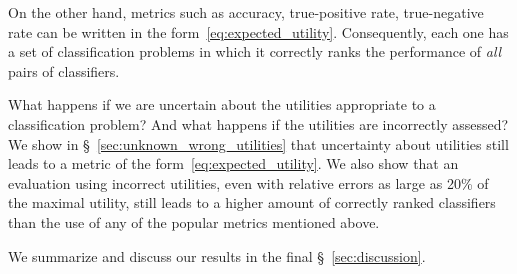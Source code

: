 \documentclass[\ifafour a4paper,12pt,\else a5paper,10pt,\fi%
onecolumn,oneside,article,%
british%
]{memoir}
\theoremstyle{remark}
\theoremstyle{innote}
\newcommand*{\wrench}{{\fontencoding{U}\fontfamily{fontawesomethree}\selectfont\symbol{114}}}
\newcommand{\mynotew}[1]{{\footnotesize\color{notecolour}\wrench\ #1}}
\renewcommand*{\|}[1][]{\nonscript\:#1\vert\nonscript\:\mathopen{}}
\newcommand*{\sect}{\S}%
\begin{document}
On the other hand, metrics such as accuracy, true-positive rate, true-negative rate can be written in the form~\eqref{eq:expected_utility}. Consequently, each one has a set of classification problems in which it correctly ranks the performance of \emph{all} pairs of classifiers.

What happens if we are uncertain about the utilities appropriate to a classification problem? And what happens if the utilities are incorrectly assessed? We show in \sect~\ref{sec:unknown_wrong_utilities} that uncertainty about utilities still leads to a metric of the form~\eqref{eq:expected_utility}. We also show that an evaluation using incorrect utilities, even with relative errors as large as 20\% of the maximal utility, still leads to a higher amount of correctly ranked classifiers than the use of any of the popular metrics mentioned above.

We summarize and discuss our results in the final \sect~\ref{sec:discussion}.



\end{document}
